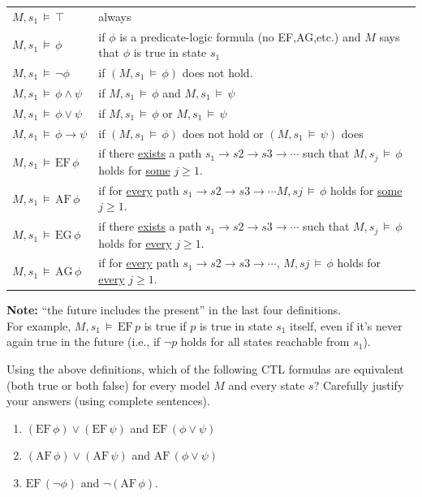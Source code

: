 \documentclass[12pt,letterpaper,boxed,cm]{hmcpset}
\newcommand{\ra}[0]{\rightarrow}
\newcommand{\turn}[0]{\,\vDash\,}
\newcommand{\EF}[0]{\text{EF}\,}
\newcommand{\AF}[0]{\text{AF}\,}
\newcommand{\EG}[0]{\text{EG}\,}
\newcommand{\AG}[0]{\text{AG}\,}
\begin{document}
\begin{center}
    \begin{tabular}{l l}
        $M, s_1 \turn \top$           & always \\
        $M,s_1 \turn \phi$            & if $\phi$ is a predicate-logic formula (no EF,AG,etc.)
                                       and $M$ says that $\phi$ is true in state $s_1$ \\
        $M,s_1 \turn \neg\phi$        & if $(M,s_1 \turn \phi)$ does not hold. \\
        $M,s_1 \turn \phi \land \psi$ & if $M,s_1 \turn \phi$ and $M,s_1 \turn \psi$ \\
        $M,s_1 \turn \phi \lor \psi$  & if $ M,s_1 \turn \phi$ or $ M,s_1 \turn \psi$ \\
        $M,s_1 \turn \phi \ra \psi$   & if $(M,s_1 \turn \phi)$ does not hold or $(M,s_1 \turn \psi)$ does \\
        $M,s_1 \turn \EF \phi$        & if there \ul{exists} a path $s_1 \ra s2 \ra s3 \ra \cdots$  such that
                                       $M,s_j \turn \phi$  holds for \ul{some} $j \ge 1$. \\
        $M,s_1 \turn \AF \phi$        & if for \ul{every} path $s_1 \ra s2 \ra s3 \ra \cdots M,sj \turn \phi$ 
                                       holds for \ul{some} $j \ge 1$. \\
        $M,s_1 \turn \EG \phi$        & if there \ul{exists} a path $s_1 \ra s2 \ra s3 \ra \cdots$  such that
                                       $M,s_j \turn \phi$  holds for \ul{every} $j \ge 1$. \\
        $M,s_1 \turn \AG \phi$        & if for \ul{every} path $s_1 \ra s2 \ra s3 \ra \cdots$,  $M,sj \turn \phi$  
                                       holds for \ul{every} $j \ge 1$.
    \end{tabular}
\end{center}

\textbf{Note:}  ``the future includes the present'' in the last four definitions.\\
For example, $M,s_1 \turn \EF p$  is true if $p$ is true in state $s_1$ itself, 
even if it's never again true in the future (i.e., if $\neg p$ holds for all states reachable from $s_1$).
\newpage

\begin{problem}[1.]
    [15 points] Using the above definitions, which of the following CTL formulas are equivalent (both true or both false) for every model $M$ and every state $s$?  Carefully justify your answers (using complete sentences).
    \begin{enumerate}[label=\Alph*.]
        \item $(\EF \phi) \lor (\EF \psi)$   and    $\EF (\phi \lor \psi)$
        \item $(\AF \phi) \lor (\AF \psi)$    and   $\AF (\phi \lor \psi)$
        \item $\EF (\neg\phi)$   and    $\neg(\AF \phi)$.
    \end{enumerate}
\end{problem}
\end{document}
